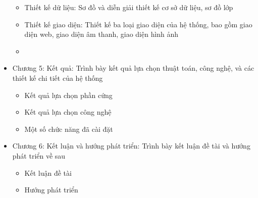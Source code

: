\begin{itemize}
\begin{itemize}
              \item Thiết kế dữ liệu: Sơ đồ và diễn giải thiết kế cơ sở dữ liệu, sơ đồ lớp
              \item Thiết kế giao diện: Thiết kế ba loại giao diện của hệ thống, bao gồm giao diện web, giao diện âm thanh, giao diện hình ảnh
              \item 
          \end{itemize}
    \item Chương 5: Kết quả: Trình bày kết quả lựa chọn thuật toán, công nghệ, và các thiết kế chi tiết của hệ thống
          \begin{itemize}
              \item Kết quả lựa chọn phần cứng
              \item Kết quả lựa chọn công nghệ
              \item Một số chức năng đã cài đặt
          \end{itemize}
    \item Chương 6: Kết luận và hướng phát triển: Trình bày kết luận đề tài và hướng phát triển về sau
          \begin{itemize}
              \item Kết luận đề tài
              \item Hướng phát triển
          \end{itemize}
\end{itemize}